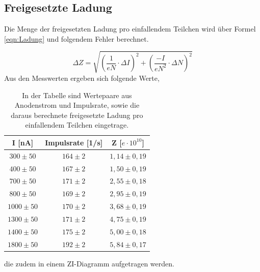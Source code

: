 \documentclass[titlepage = firstcover]{scrartcl}
\begin{document}
        \subsection{Freigesetzte Ladung}
            Die Menge der freigesetzten Ladung pro einfallendem Teilchen wird über Formel \ref{eqn:Ladung} und folgendem Fehler berechnet.

            \begin{equation*}
                \Delta Z = \sqrt{\left(\frac{1}{eN} \cdot \Delta I\right)^2 + \left( \frac{-I}{eN^2} \cdot \Delta N\right)^2}
            \end{equation*}
            \noindent
            Aus den Messwerten ergeben sich folgende Werte,

            \begin{table}[h]
                \centering
                \caption{In der Tabelle sind Wertepaare aus Anodenstrom und Impulsrate, sowie die daraus berechnete freigesetzte Ladung pro einfallendem Teilchen eingetrage.}
                
                \begin{tabular}{c c c }
                    \toprule
                    {I [nA]} & {Impulsrate [1/s]} & {Z [$e \cdot 10^{10}$]} \\
                    \midrule
                    $300 \pm 50$ & $164 \pm 2$ & $1,14 \pm 0,19$\\
                    $400 \pm 50$ & $167 \pm 2$ & $1,50 \pm 0,19$\\
                    $700 \pm 50$ & $171 \pm 2$ & $2,55 \pm 0,18$\\
                    $800 \pm 50$ & $169 \pm 2$ & $2,95 \pm 0,19$\\
                    $1000 \pm 50$ & $170 \pm 2$ & $3,68 \pm 0,19$\\
                    $1300 \pm 50$ & $171 \pm 2$ & $4,75 \pm 0,19$\\
                    $1400 \pm 50$ & $175 \pm 2$ & $5,00 \pm 0,18$\\
                    $1800 \pm 50$ & $192 \pm 2$ & $5,84 \pm 0,17$\\
                     
                    \bottomrule
                \end{tabular}
            \end{table}
            \noindent
            die zudem in einem ZI-Diagramm aufgetragen werden.

            \FloatBarrier
\end{document}
